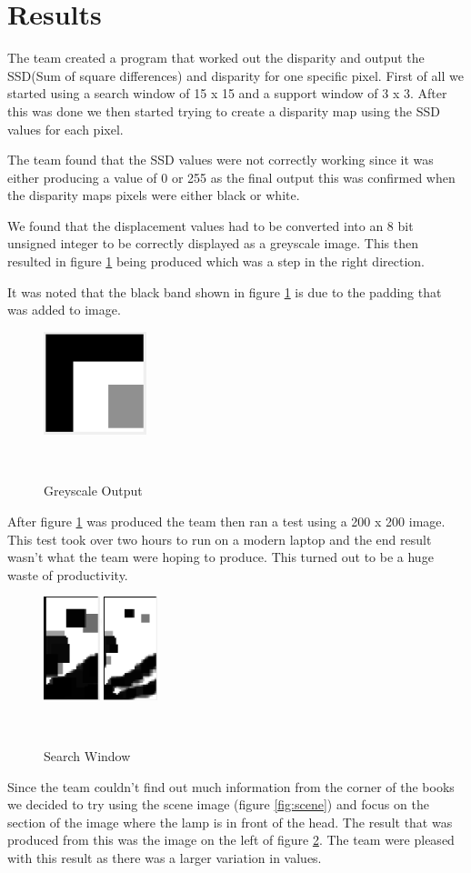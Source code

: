 \documentclass[twocolumn]{article}
\begin{document}
\section{Results}
\vspace{-1ex}

The team created a program that worked out the disparity and output the SSD(Sum of square differences) and disparity for one specific pixel. First of all we started using a search window of 15 x 15 and a support window of 3 x 3. After this was done we then started trying to create a disparity map using the SSD values for each pixel.  

The team found that the SSD values were not correctly working since it was either producing a value of 0 or 255 as the final output this was confirmed when the disparity maps pixels were either black or white. 

 We found that the displacement values had to be converted into an 8 bit unsigned integer to be correctly displayed as a greyscale image. This then resulted in figure \ref{fig:Third_Result} being produced which was a step in the right direction. 

It was noted that the black band shown in figure \ref{fig:Third_Result} is due to the padding that was added to image.  

\begin{figure}[H]
\centering
  \includegraphics[height=30mm]{Figures/Third_Result}
    \caption{Greyscale Output}~\label{fig:Third_Result}
\end{figure} 

After figure \ref{fig:Third_Result} was produced the team then ran a test using a 200 x 200 image. This test took over two hours to run on a modern laptop and the end result wasn't what the team were hoping to produce. This turned out to be a huge waste of productivity.  
 
\begin{figure}[H]
\centering
  \includegraphics[height=30mm]{Figures/Search_Window_Comparison}
    \caption{Search Window}~\label{fig:Search_Window}
\end{figure} 
Since the team couldn't find out much information from the corner of the books we decided to try using the scene image (figure \ref{fig:scene}) and focus on the section of the image where the lamp is in front of the head. The result that was produced from this was the image on the left of figure \ref{fig:Search_Window}. The team were pleased with this result as there was a larger variation in values. 
\end{document}
